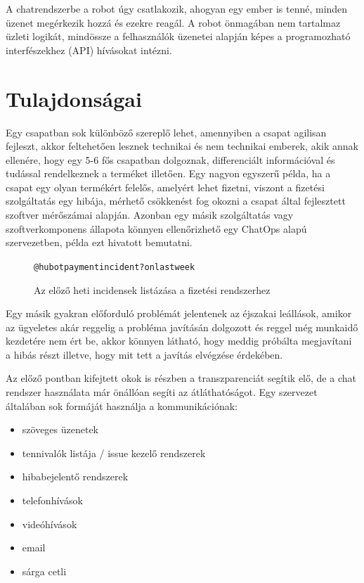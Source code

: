 A chatrendszerbe a robot úgy csatlakozik, ahogyan egy ember is tenné, minden üzenet megérkezik hozzá és ezekre reagál. A robot önmagában nem tartalmaz üzleti logikát, mindössze a felhasználók üzenetei alapján képes a programozható interfészekhez (API) hívásokat intézni.

\section{Tulajdonságai}

\label{subsection:better_communication}
Egy csapatban sok különböző szereplő lehet, amennyiben a csapat agilisan fejleszt, akkor feltehetően lesznek technikai és nem technikai emberek, akik annak ellenére, hogy egy 5-6 fős csapatban dolgoznak, differenciált információval és tudással rendelkeznek a terméket illetően. Egy nagyon egyszerű példa, ha a csapat egy olyan termékért felelős, amelyért lehet fizetni, viszont a fizetési szolgáltatás egy hibája, mérhető csökkenést fog okozni a csapat által fejlesztett szoftver mérőszámai alapján. Azonban egy másik szolgáltatás vagy szoftverkomponens állapota könnyen ellenőrizhető egy ChatOps alapú szervezetben,  példa ezt hivatott bemutatni.

\begin{figure}
    \begin{alltt}
@hubot payment incident? on last week
    \end{alltt}
    \caption[DUMMY]%
    {Az előző heti incidensek listázása a fizetési rendszerhez}%
    \label{fig:get_outage_for_payment}
\end{figure}

Egy másik gyakran előforduló problémát jelentenek az éjszakai leállások, amikor az ügyeletes akár reggelig a probléma javításán dolgozott és reggel még munkaidő kezdetére nem ért be, akkor könnyen látható, hogy meddig próbálta megjavítani a hibás részt illetve, hogy mit tett a javítás elvégzése érdekében.


Az előző pontban kifejtett okok is részben a transzparenciát segítik elő, de a chat rendszer használata már önállóan segíti az átláthatóságot.
Egy szervezet általában sok formáját használja a kommunikációnak:

\begin{itemize}
  \item szöveges üzenetek
  \item tennivalók listája / issue kezelő rendszerek
  \item hibabejelentő rendszerek
  \item telefonhívások
  \item videóhívások
  \item email
  \item sárga cetli
\end{itemize}


